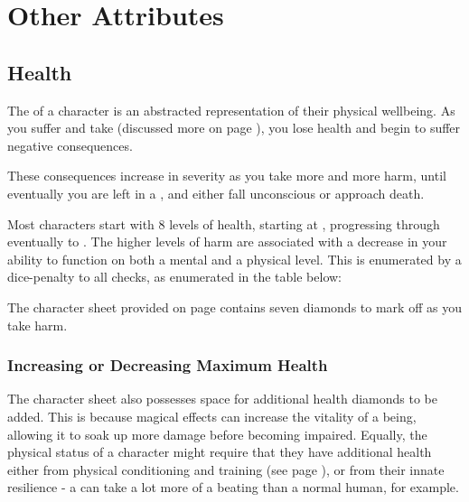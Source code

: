 \chapter{Other Attributes}




\section{Health}

The  of a character is an abstracted representation of their physical wellbeing. As you suffer  and take  (discussed more on page \pageref{S:Damage}), you lose health and begin to suffer negative consequences. 

These consequences increase in severity as you take more and more harm, until eventually you are left in a , and either fall unconscious or approach death. 

Most characters start with 8 levels of health, starting at , progressing through  eventually to . The higher levels of harm are associated with a decrease in your ability to function on both a mental and a physical level. This is enumerated by a dice-penalty to all checks, as enumerated in the table below:


The character sheet provided on page \pageref{S:CharacterSheet} contains seven diamonds to mark off as you take harm. 


\subsection{Increasing or Decreasing Maximum Health}

The character sheet also possesses space for additional health diamonds to be added. This is because magical effects can increase the vitality of a being, allowing it to soak up more damage before becoming impaired. Equally, the physical status of a character might require that they have additional health either from physical conditioning and training (see page \pageref{S:Progression}), or from their innate resilience - a  can take a lot more of a beating than a normal human, for example. 

